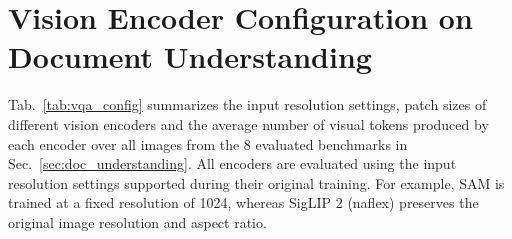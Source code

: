 \documentclass{article}
\begin{document}
\section{Vision Encoder Configuration on Document Understanding}
\label{sec:appendix_vqa_config}

Tab.~\ref{tab:vqa_config} summarizes the input resolution settings, patch sizes of different vision encoders and the average number of visual tokens produced by each encoder over all images from the 8 evaluated benchmarks in Sec.~\ref{sec:doc_understanding}. All encoders are evaluated using the input resolution settings supported during their original training. For example, SAM is trained at a fixed resolution of 1024, whereas SigLIP 2 (naflex) preserves the original image resolution and aspect ratio. 

\begin{table}[h]
\centering
\setlength{\tabcolsep}{4pt}
\caption{Configuration of different vision encoders and average visual tokens on 8 benchmarks used for evaluation in Sec.~\ref{sec:doc_understanding}. Any denotes using the original image resolution as input. For fixed-resolution settings, both the height and width are resized to the specified resolution. All encoders follow their original training input configurations.}

\label{tab:vqa_config}
\end{table}
\end{document}
